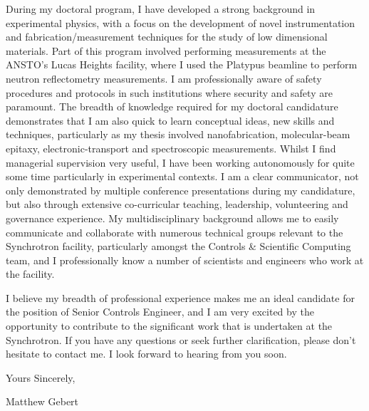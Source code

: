 \documentclass[10pt,a4paper,ragged2e,withhyper,paragraphstrue]{altacv}
\newcommand{\pind}{\hspace{24pt}}
\begin{document}
{    %
    \pind During my doctoral program, I have developed a strong background in experimental physics, with a focus on the development of novel instrumentation and 
    fabrication/measurement techniques for the study of low dimensional materials. Part of this program involved performing measurements at the ANSTO's Lucas Heights
    facility, where I used the Platypus beamline to perform neutron reflectometry measurements. I am professionally aware of safety procedures and protocols 
    in such institutions where security and safety are paramount. The breadth of knowledge required for my doctoral candidature demonstrates that I am also quick to learn 
    conceptual ideas, new skills and techniques, particularly as my thesis involved nanofabrication, molecular-beam epitaxy, electronic-transport and spectroscopic measurements.
    Whilst I find managerial supervision very useful, I have been working autonomously for quite some time particularly in experimental contexts.
    I am a clear communicator, not only demonstrated by multiple conference presentations during my candidature, but also through extensive co-curricular teaching, 
    leadership, volunteering and governance experience. My multidisciplinary background allows me to easily communicate and collaborate with numerous technical groups relevant
    to the Synchrotron facility, particularly amongst the Controls \& Scientific Computing team, and I professionally know a number of scientists and engineers 
    who work at the facility.

    \pind I believe my breadth of professional experience makes me an ideal candidate for the position of Senior Controls Engineer, and I am very excited by the opportunity to
    contribute to the significant work that is undertaken at the Synchrotron. If you have any questions or seek further clarification, please don't hesitate to contact me.
    I look forward to hearing from you soon.
    
    \vspace{1em}

    Yours Sincerely, \newline

    {\color{emphasis}Matthew Gebert}

    }
    
    \divider
\end{document}

